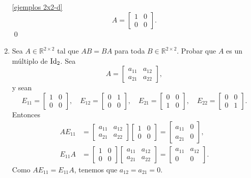 \begin{enumerate}[topsep=6pt,itemsep=.4cm]
\noindent\ref{ejemplos 2x2-d}
\begin{equation*}
    A = \begin{bmatrix}
        1 & 0\\ 0 & 0
        \end{bmatrix}.
\end{equation*}
\qed


\item\label{2x2 central}  Sea $A \in\mathbb{R}^{2\times 2}$ tal que $AB=BA$ para toda $B\in\mathbb{R}^{2\times 2}$. Probar que $A$ es un múltiplo de $\operatorname{Id}_2$.
\rta Sea
\begin{equation*}
    A = \begin{bmatrix} a_{11} & a_{12}\\ a_{21} & a_{22} \end{bmatrix},
\end{equation*}
y sean 
\begin{equation*}
    E_{11} = \begin{bmatrix} 1 & 0\\ 0 & 0\end{bmatrix},
    \quad
    E_{12} = \begin{bmatrix} 0 & 1\\ 0 & 0\end{bmatrix},
    \quad
    E_{21} = \begin{bmatrix} 0 & 0\\ 1 & 0\end{bmatrix},
    \quad
    E_{22} = \begin{bmatrix} 0 & 0\\ 0 & 1\end{bmatrix}. 
\end{equation*}
Entonces 
\begin{align*}
    AE_{11} &= \begin{bmatrix} a_{11} & a_{12}\\ a_{21} & a_{22} \end{bmatrix} \begin{bmatrix} 1 & 0\\ 0 & 0\end{bmatrix} =
    \begin{bmatrix} a_{11} &0\\ a_{21} & 0\end{bmatrix}, \\
    E_{11}A &=  \begin{bmatrix} 1 & 0\\ 0 & 0\end{bmatrix} \begin{bmatrix} a_{11} & a_{12}\\ a_{21} & a_{22} \end{bmatrix}=
    \begin{bmatrix} a_{11} & a_{12}\\ 0 & 0 \end{bmatrix}.
\end{align*}
Como $AE_{11} = E_{11}A$, tenemos que $a_{12} = a_{21} =0$.


\end{enumerate}
